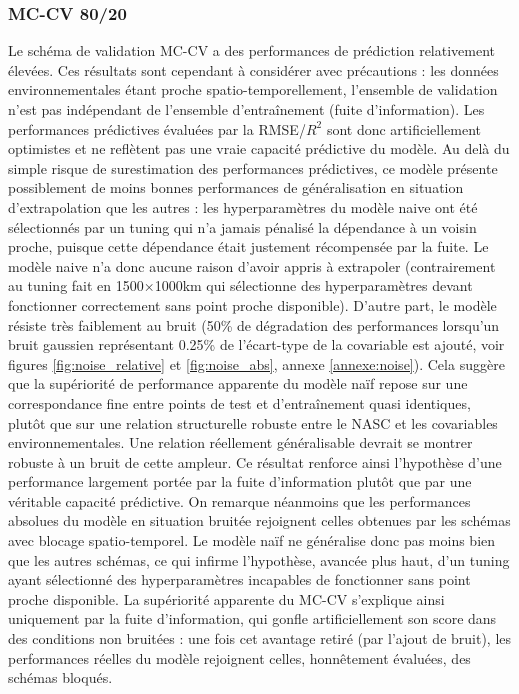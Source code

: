 \documentclass[11pt,a4paper,oneside]{report}
\begin{document}
	\subsubsection{MC-CV 80/20}
	Le schéma de validation MC-CV a des performances de prédiction relativement élevées. Ces résultats sont cependant à considérer avec précautions : les données environnementales étant proche spatio-temporellement, l'ensemble de validation n'est pas indépendant de l'ensemble d'entraînement (fuite d'information). Les performances prédictives évaluées par la RMSE/$R^{2}$ sont donc artificiellement optimistes et ne reflètent pas une vraie capacité prédictive du modèle. Au delà du simple risque de surestimation des performances prédictives, ce modèle présente possiblement de moins bonnes performances de généralisation en situation d'extrapolation que les autres : les hyperparamètres du modèle naive ont été sélectionnés par un tuning qui n'a jamais pénalisé la dépendance à un voisin proche, puisque cette dépendance était justement récompensée par la fuite. Le modèle naive n'a donc aucune raison d'avoir appris à extrapoler (contrairement au tuning fait en 1500×1000km qui sélectionne des hyperparamètres devant fonctionner correctement sans point proche disponible). 
	D'autre part, le modèle résiste très faiblement au bruit (50\% de dégradation des performances lorsqu'un bruit gaussien représentant 0.25\% de l'écart-type de la covariable est ajouté, voir figures \ref{fig:noise_relative} et \ref{fig:noise_abs}, annexe \ref{annexe:noise}). Cela suggère que la supériorité de performance apparente du modèle naïf repose sur une correspondance fine entre points de test et d'entraînement quasi identiques, plutôt que sur une relation structurelle robuste entre le NASC et les covariables environnementales. Une relation réellement généralisable devrait se montrer robuste à un bruit de cette ampleur. Ce résultat renforce ainsi l'hypothèse d'une performance largement portée par la fuite d'information plutôt que par une véritable capacité prédictive. On remarque néanmoins que les performances absolues du modèle en situation bruitée rejoignent celles obtenues par les schémas avec blocage spatio-temporel. Le modèle naïf ne généralise donc pas moins bien que les autres schémas, ce qui infirme l'hypothèse, avancée plus haut, d'un tuning ayant sélectionné des hyperparamètres incapables de fonctionner sans point proche disponible. La supériorité apparente du MC-CV s'explique ainsi uniquement par la fuite d'information, qui gonfle artificiellement son score dans des conditions non bruitées : une fois cet avantage retiré (par l'ajout de bruit), les performances réelles du modèle rejoignent celles, honnêtement évaluées, des schémas bloqués.
	
\end{document}
